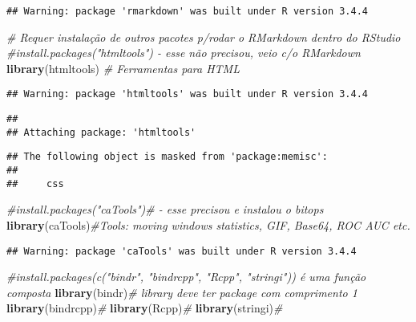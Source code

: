 \documentclass[]{article}
\newenvironment{Shaded}{\begin{snugshade}}{\end{snugshade}}
\newcommand{\KeywordTok}[1]{\textcolor[rgb]{0.13,0.29,0.53}{\textbf{#1}}}
\newcommand{\CommentTok}[1]{\textcolor[rgb]{0.56,0.35,0.01}{\textit{#1}}}
\newcommand{\NormalTok}[1]{#1}
\begin{document}
\begin{verbatim}
## Warning: package 'rmarkdown' was built under R version 3.4.4
\end{verbatim}

\begin{Shaded}
\begin{Highlighting}[]
\CommentTok{# Requer instalação de outros pacotes p/rodar o RMarkdown dentro do RStudio}
\CommentTok{#install.packages("htmltools") - esse não precisou, veio c/o RMarkdown}
\KeywordTok{library}\NormalTok{(htmltools) }\CommentTok{# Ferramentas para HTML}
\end{Highlighting}
\end{Shaded}

\begin{verbatim}
## Warning: package 'htmltools' was built under R version 3.4.4
\end{verbatim}

\begin{verbatim}
## 
## Attaching package: 'htmltools'
\end{verbatim}

\begin{verbatim}
## The following object is masked from 'package:memisc':
## 
##     css
\end{verbatim}

\begin{Shaded}
\begin{Highlighting}[]
\CommentTok{#install.packages("caTools")#   - esse precisou e instalou o bitops}
\KeywordTok{library}\NormalTok{(caTools)}\CommentTok{#Tools: moving windows statistics, GIF, Base64, ROC AUC etc.}
\end{Highlighting}
\end{Shaded}

\begin{verbatim}
## Warning: package 'caTools' was built under R version 3.4.4
\end{verbatim}

\begin{Shaded}
\begin{Highlighting}[]
\CommentTok{#install.packages(c("bindr", "bindrcpp", "Rcpp", "stringi")) é uma função composta}
\KeywordTok{library}\NormalTok{(bindr)}\CommentTok{# library deve ter package com comprimento 1}
\KeywordTok{library}\NormalTok{(bindrcpp)}\CommentTok{#}
\KeywordTok{library}\NormalTok{(Rcpp)}\CommentTok{#}
\KeywordTok{library}\NormalTok{(stringi)}\CommentTok{#}
\end{Highlighting}
\end{Shaded}
\end{document}
